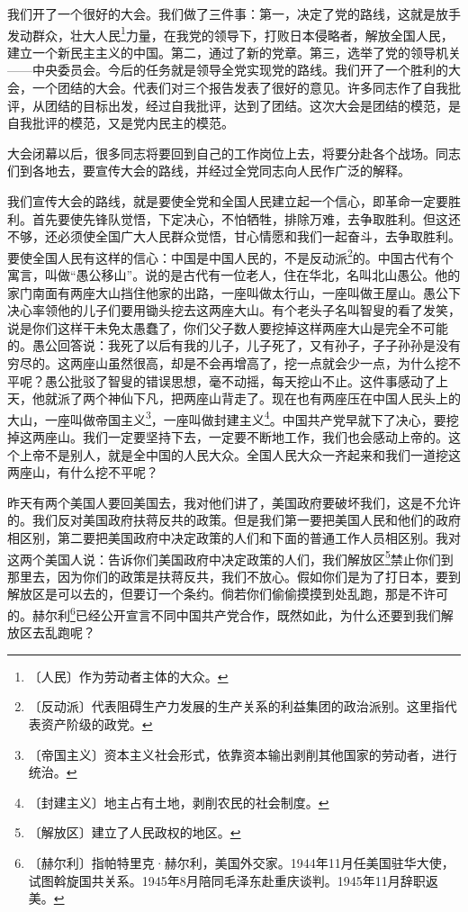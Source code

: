 \documentclass[12pt,UTF-8,openany]{ctexbook}
\begin{document}
\begin{normalsize}
    
    我们开了一个很好的大会。我们做了三件事：第一，决定了党的路线，这就是放手发动群众，壮大人民\footnote{〔人民〕作为劳动者主体的大众。}力量，在我党的领导下，打败日本侵略者，解放全国人民，建立一个新民主主义的中国。第二，通过了新的党章。第三，选举了党的领导机关——中央委员会。今后的任务就是领导全党实现党的路线。我们开了一个胜利的大会，一个团结的大会。代表们对三个报告发表了很好的意见。许多同志作了自我批评，从团结的目标出发，经过自我批评，达到了团结。这次大会是团结的模范，是自我批评的模范，又是党内民主的模范。
    
    大会闭幕以后，很多同志将要回到自己的工作岗位上去，将要分赴各个战场。同志们到各地去，要宣传大会的路线，并经过全党同志向人民作广泛的解释。
    
    我们宣传大会的路线，就是要使全党和全国人民建立起一个信心，即革命一定要胜利。首先要使先锋队觉悟，下定决心，不怕牺牲，排除万难，去争取胜利。但这还不够，还必须使全国广大人民群众觉悟，甘心情愿和我们一起奋斗，去争取胜利。要使全国人民有这样的信心：中国是中国人民的，不是反动派\footnote{〔反动派〕代表阻碍生产力发展的生产关系的利益集团的政治派别。这里指代表资产阶级的政党。}的。中国古代有个寓言，叫做“愚公移山”。说的是古代有一位老人，住在华北，名叫北山愚公。他的家门南面有两座大山挡住他家的出路，一座叫做太行山，一座叫做王屋山。愚公下决心率领他的儿子们要用锄头挖去这两座大山。有个老头子名叫智叟的看了发笑，说是你们这样干未免太愚蠢了，你们父子数人要挖掉这样两座大山是完全不可能的。愚公回答说：我死了以后有我的儿子，儿子死了，又有孙子，子子孙孙是没有穷尽的。这两座山虽然很高，却是不会再增高了，挖一点就会少一点，为什么挖不平呢？愚公批驳了智叟的错误思想，毫不动摇，每天挖山不止。这件事感动了上天，他就派了两个神仙下凡，把两座山背走了。现在也有两座压在中国人民头上的大山，一座叫做帝国主义\footnote{〔帝国主义〕资本主义社会形式，依靠资本输出剥削其他国家的劳动者，进行统治。}，一座叫做封建主义\footnote{〔封建主义〕地主占有土地，剥削农民的社会制度。 }。中国共产党早就下了决心，要挖掉这两座山。我们一定要坚持下去，一定要不断地工作，我们也会感动上帝的。这个上帝不是别人，就是全中国的人民大众。全国人民大众一齐起来和我们一道挖这两座山，有什么挖不平呢？
    
    昨天有两个美国人要回美国去，我对他们讲了，美国政府要破坏我们，这是不允许的。我们反对美国政府扶蒋反共的政策。但是我们第一要把美国人民和他们的政府相区别，第二要把美国政府中决定政策的人们和下面的普通工作人员相区别。我对这两个美国人说：告诉你们美国政府中决定政策的人们，我们解放区\footnote{〔解放区〕建立了人民政权的地区。}禁止你们到那里去，因为你们的政策是扶蒋反共，我们不放心。假如你们是为了打日本，要到解放区是可以去的，但要订一个条约。倘若你们偷偷摸摸到处乱跑，那是不许可的。赫尔利\footnote{〔赫尔利〕指帕特里克·赫尔利，美国外交家。1944年11月任美国驻华大使，试图斡旋国共关系。1945年8月陪同毛泽东赴重庆谈判。1945年11月辞职返美。}已经公开宣言不同中国共产党合作，既然如此，为什么还要到我们解放区去乱跑呢？
    

\end{normalsize}
\end{document}

